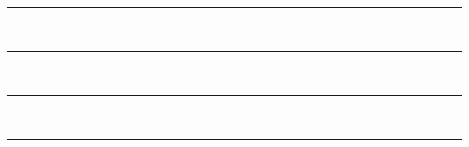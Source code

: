 \documentclass[10pt]{article}
\begin{document}
    \begin{center}
        \rule{0.2\textwidth}{1pt}
        \\
        \vspace{-1.225em}
        \rule{0.3\textwidth}{0.8pt}
        \\
        \vspace{-1.225em}
        \rule{0.4\textwidth}{0.5pt}
        \\
        \vspace{-1.225em}
        \rule{0.5\textwidth}{0.4pt}
    \end{center}
\end{document}
